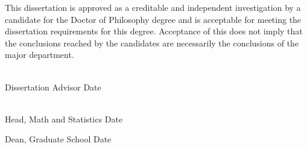 \documentclass[SDSUThesis.tex]{subfiles}
\begin{document}
\begin{center}
\yourtitle
\vspace{0.5in}
\end{center}

\par This dissertation is approved as a creditable and independent investigation by a 
candidate for the Doctor of Philosophy degree and is acceptable for 
meeting the dissertation requirements for this degree. Acceptance of this does not imply 
that the conclusions reached by the candidates are necessarily the conclusions of the 
major department.

\vspace{1.5in}

\singlespacing

\hspace*{\fill}\underline{$~~~~~~~~~~~~~~~~~~~~~~~~~~~~~~~~~~~~~~~~~~~~~~~~~~~~$}\\
\hspace*{194bp}\youradvisor\\
\hspace*{\fill}Dissertation Advisor \hspace*{47bp}Date

\vspace{1in}

\hspace*{\fill}\underline{$~~~~~~~~~~~~~~~~~~~~~~~~~~~~~~~~~~~~~~~~~~~~~~~~~~~~$}\\
\hspace*{194bp}\departmenthead\\
\hspace*{\fill}Head, Math and Statistics \hspace*{40bp}Date

\vspace{1in}

\hspace*{\fill}\underline{$~~~~~~~~~~~~~~~~~~~~~~~~~~~~~~~~~~~~~~~~~~~~~~~~~~~~$}\\
\hspace*{194bp}Dean, Graduate School \hspace*{54bp}Date
\end{document}
